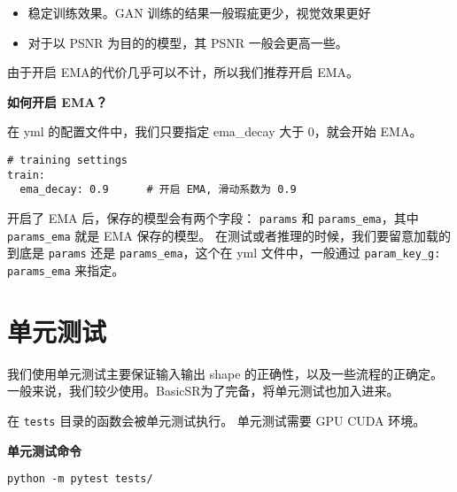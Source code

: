 \documentclass[../main.tex]{subfiles}
\begin{document}
\begin{itemize}
	\item 稳定训练效果。GAN 训练的结果一般瑕疵更少，视觉效果更好
	\item 对于以 PSNR 为目的的模型，其 PSNR 一般会更高一些。
\end{itemize}

由于开启 EMA的代价几乎可以不计，所以我们推荐开启 EMA。

\begin{hl} %
	\textbf{如何开启 EMA？}

	在 yml 的配置文件中，我们只要指定 ema\_decay 大于 0，就会开始 EMA。


\begin{verbatim}
# training settings
train:
  ema_decay: 0.9      # 开启 EMA, 滑动系数为 0.9
\end{verbatim}
\end{hl}

开启了 EMA 后，保存的模型会有两个字段： \texttt{params} 和 \texttt{params\_ema}，其中  \texttt{params\_ema} 就是 EMA 保存的模型。
在测试或者推理的时候，我们要留意加载的到底是 \texttt{params} 还是 \texttt{params\_ema}，这个在 yml 文件中，一般通过  \texttt{param\_key\_g: params\_ema} 来指定。


\section{单元测试}

我们使用单元测试主要保证输入输出 shape 的正确性，以及一些流程的正确定。
一般来说，我们较少使用。BasicSR为了完备，将单元测试也加入进来。

在 \texttt{tests} 目录的函数会被单元测试执行。
单元测试需要 GPU CUDA 环境。


\begin{hl} %
	\textbf{单元测试命令}


	\begin{verbatim}
python -m pytest tests/
	\end{verbatim}
\end{hl}
\end{document}
